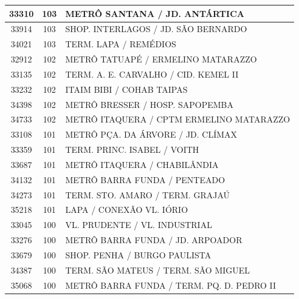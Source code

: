 \documentclass[
	12pt,				%
	oneside,			%
	a4paper,			%
	english,			%
	brazil				%
	]{abntex2ppgsi}
\begin{document}
{{\begin{apendicesenv}
\begin{longtable}{c|c|p{7cm}}
    33310 & 103   & METRÔ SANTANA / JD. ANTÁRTICA \\
\hline

    33914 & 103   & SHOP. INTERLAGOS / JD. SÃO BERNARDO \\
\hline

    34021 & 103   & TERM. LAPA / REMÉDIOS \\
\hline

    32912 & 102   & METRÔ TATUAPÉ / ERMELINO MATARAZZO \\
\hline

    33135 & 102   & TERM. A. E. CARVALHO / CID. KEMEL II \\
\hline

    33232 & 102   & ITAIM BIBI / COHAB TAIPAS \\
\hline

    34398 & 102   & METRÔ BRESSER / HOSP. SAPOPEMBA \\
\hline

    34733 & 102   & METRÔ ITAQUERA / CPTM ERMELINO MATARAZZO \\
\hline

    33108 & 101   & METRÔ PÇA. DA ÁRVORE / JD. CLÍMAX \\
\hline

    33359 & 101   & TERM. PRINC. ISABEL / VOITH \\
\hline

    33687 & 101   & METRÔ ITAQUERA / CHABILÂNDIA \\
\hline

    34132 & 101   & METRÔ BARRA FUNDA / PENTEADO \\
\hline

    34273 & 101   & TERM. STO. AMARO / TERM. GRAJAÚ \\
\hline

    35218 & 101   & LAPA / CONEXÃO VL. IÓRIO \\
\hline

    33045 & 100   & VL. PRUDENTE / VL. INDUSTRIAL \\
\hline

    33276 & 100   & METRÔ BARRA FUNDA / JD. ARPOADOR \\
\hline

    33679 & 100   & SHOP. PENHA / BURGO PAULISTA \\
\hline

    34387 & 100   & TERM. SÃO MATEUS / TERM. SÃO MIGUEL \\
\hline

    35068 & 100   & METRÔ BARRA FUNDA / TERM. PQ. D. PEDRO II \\
\hline


\end{longtable}
\end{apendicesenv}}}
\end{document}
